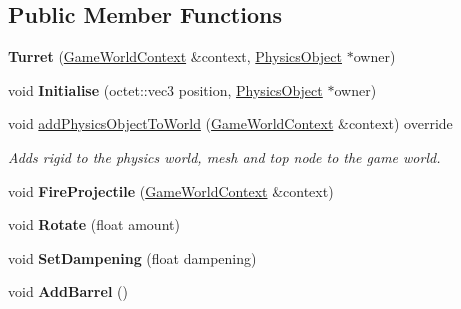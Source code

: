 \subsection*{Public Member Functions}
\begin{DoxyCompactItemize}
\item 
\hypertarget{class_arena_1_1_turret_a84a564460e55587bffc4ba085ba4e00e}{{\bfseries Turret} (\hyperlink{struct_arena_1_1_game_world_context}{Game\+World\+Context} \&context, \hyperlink{class_arena_1_1_physics_object}{Physics\+Object} $\ast$owner)}\label{class_arena_1_1_turret_a84a564460e55587bffc4ba085ba4e00e}

\item 
\hypertarget{class_arena_1_1_turret_a54b175dfcfacc445f533408b58ff5a11}{void {\bfseries Initialise} (octet\+::vec3 position, \hyperlink{class_arena_1_1_physics_object}{Physics\+Object} $\ast$owner)}\label{class_arena_1_1_turret_a54b175dfcfacc445f533408b58ff5a11}

\item 
\hypertarget{class_arena_1_1_turret_aebf826e8f5dacf6c72843f75b1b0ef92}{void \hyperlink{class_arena_1_1_turret_aebf826e8f5dacf6c72843f75b1b0ef92}{add\+Physics\+Object\+To\+World} (\hyperlink{struct_arena_1_1_game_world_context}{Game\+World\+Context} \&context) override}\label{class_arena_1_1_turret_aebf826e8f5dacf6c72843f75b1b0ef92}

\begin{DoxyCompactList}\small\item\em Adds rigid to the physics world, mesh and top node to the game world. \end{DoxyCompactList}\item 
\hypertarget{class_arena_1_1_turret_ad4700360e5412eea4ec4189a73ea3a3c}{void {\bfseries Fire\+Projectile} (\hyperlink{struct_arena_1_1_game_world_context}{Game\+World\+Context} \&context)}\label{class_arena_1_1_turret_ad4700360e5412eea4ec4189a73ea3a3c}

\item 
\hypertarget{class_arena_1_1_turret_a3166a715e0b3c243e8c7de8b71bd793b}{void {\bfseries Rotate} (float amount)}\label{class_arena_1_1_turret_a3166a715e0b3c243e8c7de8b71bd793b}

\item 
\hypertarget{class_arena_1_1_turret_a66102f8ba3e180ce587a21e52f2c9433}{void {\bfseries Set\+Dampening} (float dampening)}\label{class_arena_1_1_turret_a66102f8ba3e180ce587a21e52f2c9433}

\item 
\hypertarget{class_arena_1_1_turret_a8459459dd29f8e7cb9299c3e7d20218a}{void {\bfseries Add\+Barrel} ()}\label{class_arena_1_1_turret_a8459459dd29f8e7cb9299c3e7d20218a}

\end{DoxyCompactItemize}
